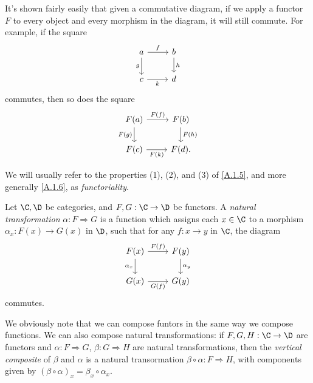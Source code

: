 \begin{remark}\label{A.1.6}
    It's shown fairly easily that given a commutative diagram, if we apply a functor $F$ to every object and every morphism in the diagram, it will still commute. For example, if the square
    \[\begin{tikzcd}
        a\ar["f", r]\ar["g"', d] & b \ar["h", d]\\
        c \ar["k"', r] & d
    \end{tikzcd}\]
    commutes, then so does the square
    \[\begin{tikzcd}
        F(a)\ar["F(f)", r]\ar["F(g)"', d] & F(b) \ar["F(h)", d]\\
        F(c) \ar["F(k)"', r] & F(d).
    \end{tikzcd}\]
\end{remark}

\begin{terminology}\label{A.1.7}
    We will usually refer to the properties (1), (2), and (3) of \cref{A.1.5}, and more generally \cref{A.1.6}, as \emph{functoriality}.
\end{terminology}

\begin{definition}\label{A.1.8}
    Let $\C,\D$ be categories, and $F,G : \C\to\D$ be functors. A \emph{natural transformation} $\alpha : F \Rightarrow G$ is a function which assigns each $x\in\C$ to a morphism $\alpha_x : F(x)\to G(x)$ in $\D$, such that for any $f : x\to y$ in $\C$, the diagram
    \[\begin{tikzcd}
        F(x) \ar["F(f)", r]\ar["\alpha_x"', d] & F(y)\ar["\alpha_y", d]\\
        G(x)\ar["G(f)"', r] & G(y)
    \end{tikzcd}\]
    commutes.
\end{definition}

\begin{remark}\label{A.1.9}
    We obviously note that we can compose funtors in the same way we compose functions. We can also compose natural transformations: if $F,G,H : \C\to\D$ are functors and $\alpha : F\Rightarrow G$, $\beta : G\Rightarrow H$ are natural transformations, then the \emph{vertical composite} of $\beta$ and $\alpha$ is a natural transormation $\beta\circ\alpha : F \Rightarrow H$, with components given by $(\beta\circ\alpha)_x=\beta_{x}\circ\alpha_x$.
\end{remark}

